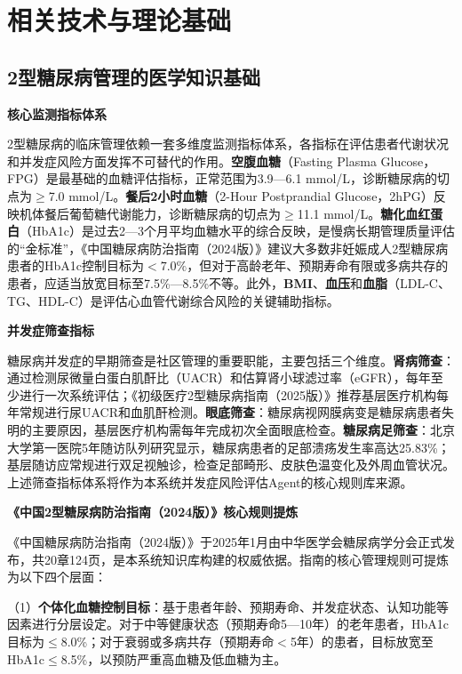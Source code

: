 \section{相关技术与理论基础}

\subsection{2型糖尿病管理的医学知识基础}

\noindent\textbf{核心监测指标体系}

2型糖尿病的临床管理依赖一套多维度监测指标体系，各指标在评估患者代谢状况和并发症风险方面发挥不可替代的作用。\textbf{空腹血糖}（Fasting Plasma Glucose，FPG）是最基础的血糖评估指标，正常范围为3.9---6.1 mmol/L，诊断糖尿病的切点为$\geq$7.0 mmol/L。\textbf{餐后2小时血糖}（2-Hour Postprandial Glucose，2hPG）反映机体餐后葡萄糖代谢能力，诊断糖尿病的切点为$\geq$11.1 mmol/L。\textbf{糖化血红蛋白}（HbA1c）是过去2---3个月平均血糖水平的综合反映，是慢病长期管理质量评估的``金标准''，《中国糖尿病防治指南（2024版）》建议大多数非妊娠成人2型糖尿病患者的HbA1c控制目标为${<}7.0\%$，但对于高龄老年、预期寿命有限或多病共存的患者，应适当放宽目标至7.5\%---8.5\%不等。此外，\textbf{BMI}、\textbf{血压}和\textbf{血脂}（LDL-C、TG、HDL-C）是评估心血管代谢综合风险的关键辅助指标\todocite{}\todocite{}。

\noindent\textbf{并发症筛查指标}

糖尿病并发症的早期筛查是社区管理的重要职能，主要包括三个维度。\textbf{肾病筛查}：通过检测尿微量白蛋白肌酐比（UACR）和估算肾小球滤过率（eGFR），每年至少进行一次系统评估；《初级医疗2型糖尿病指南（2025版）》推荐基层医疗机构每年常规进行尿UACR和血肌酐检测。\textbf{眼底筛查}：糖尿病视网膜病变是糖尿病患者失明的主要原因，基层医疗机构需每年完成初次全面眼底检查。\textbf{糖尿病足筛查}：北京大学第一医院5年随访队列研究显示，糖尿病患者的足部溃疡发生率高达25.83\%；基层随访应常规进行双足视触诊，检查足部畸形、皮肤色温变化及外周血管状况。上述筛查指标体系将作为本系统并发症风险评估Agent的核心规则库来源\todocite{}\todocite{}。

\noindent\textbf{《中国2型糖尿病防治指南（2024版）》核心规则提炼}

《中国糖尿病防治指南（2024版）》于2025年1月由中华医学会糖尿病学分会正式发布，共20章124页，是本系统知识库构建的权威依据。指南的核心管理规则可提炼为以下四个层面\todocite{}：

（1）\textbf{个体化血糖控制目标}：基于患者年龄、预期寿命、并发症状态、认知功能等因素进行分层设定。对于中等健康状态（预期寿命5---10年）的老年患者，HbA1c目标为$\leq$8.0\%；对于衰弱或多病共存（预期寿命${<}$5年）的患者，目标放宽至HbA1c$\leq$8.5\%，以预防严重高血糖及低血糖为主\todocite{}。

